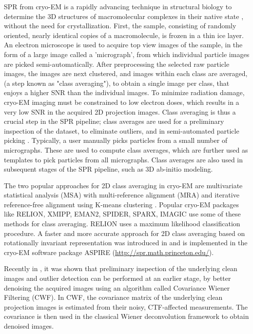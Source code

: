 \documentclass{article}
\begin{document}
SPR from cryo-EM is a rapidly advancing technique in structural biology to determine
the 3D structures of macromolecular complexes in their native state \cite{Frank1, Kuhlbrandt1443},
 without the need for crystallization. First, the sample, consisting of randomly oriented, nearly identical copies of a macromolecule, is frozen in a thin ice layer. An electron microscope is used to acquire top view images of the sample, in the form of a large image called a 'micrograph', from which individual particle images are picked semi-automatically. After preprocessing the selected raw particle images, the images are next clustered, and images within each class are averaged, (a step known as "class averaging"), to obtain a single image per class, that enjoys a higher SNR than the individual images. To minimize radiation damage, cryo-EM imaging must be constrained to low electron doses, which results in a very low SNR in the acquired 2D projection images. Class averaging is thus a crucial step in the SPR pipeline; class averages are used for a preliminary inspection of the dataset, to eliminate outliers, and in semi-automated particle picking \cite{relion}. Typically, a user manually picks particles from a small number of micrographs. These are used to compute class averages, which are further used as templates to pick particles from all micrographs. Class averages are also used in subsequent stages of the SPR pipeline, such as 3D ab-initio modeling.
 
The two popular approaches for 2D class averaging \cite{Penczek1992,Penczek1996, vanHeel1990a, vanHeel1981, chirikjian1, chirikjian2} in cryo-EM are multivariate statistical analysis (MSA)\cite{vanHeel1981} with multi-reference alignment (MRA) \cite{Dube1993} and iterative reference-free alignment using K-means clustering \cite{Penczek1996}. Popular cryo-EM packages like RELION, XMIPP, EMAN2, SPIDER, SPARX, IMAGIC \cite{imagic, spider, eman2, xmipp, relion, gpurelion} use some of these methods for class averaging. RELION uses a maximum likelihood classification procedure. A faster and more accurate approach for 2D class averaging based on rotationally invariant representation was introduced in \cite{zhao} and is implemented in the cryo-EM software package ASPIRE (\url{http://spr.math.princeton.edu/}).

Recently in \cite{cwf}, it was shown that preliminary inspection of the underlying clean images and outlier detection can be performed at an earlier stage, by better denoising the acquired images using an algorithm called Covariance Wiener Filtering (CWF). In CWF, the covariance matrix of the underlying clean projection images is estimated from their noisy, CTF-affected measurements. The covariance is then used in the classical Wiener deconvolution framework to obtain denoised images. 
\end{document}

